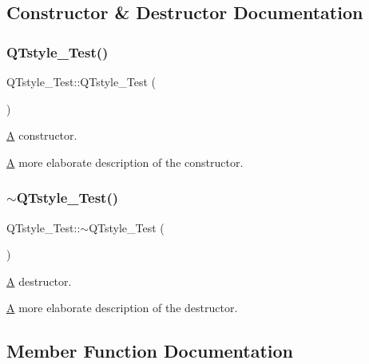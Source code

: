 \subsection{Constructor \& Destructor Documentation}
\mbox{\label{class_q_tstyle___test_a14a296ea4e2ad446712f2310bec60766}} 
\subsubsection{\texorpdfstring{QTstyle\_Test()}{QTstyle\_Test()}}
{\footnotesize\ttfamily Q\+Tstyle\+\_\+\+Test\+::\+Q\+Tstyle\+\_\+\+Test (\begin{DoxyParamCaption}{ }\end{DoxyParamCaption})}



\mbox{\hyperlink{class_a}{A}} constructor. 

\mbox{\hyperlink{class_a}{A}} more elaborate description of the constructor. \mbox{\label{class_q_tstyle___test_a7e82397d534d9a867f0857da01a46e9e}} 
\subsubsection{\texorpdfstring{$\sim$QTstyle\_Test()}{~QTstyle\_Test()}}
{\footnotesize\ttfamily Q\+Tstyle\+\_\+\+Test\+::$\sim$\+Q\+Tstyle\+\_\+\+Test (\begin{DoxyParamCaption}{ }\end{DoxyParamCaption})}



\mbox{\hyperlink{class_a}{A}} destructor. 

\mbox{\hyperlink{class_a}{A}} more elaborate description of the destructor. 

\subsection{Member Function Documentation}
\mbox{\label{class_q_tstyle___test_a8840748753118dd468e8368a28e49c62}} 
